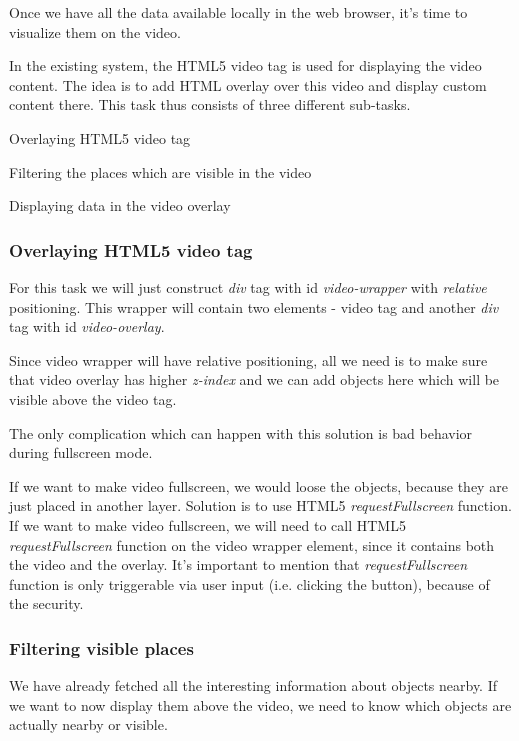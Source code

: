 \documentclass[journal]{IEEEtran}
\begin{document}
Once we have all the data available locally in the web browser, it's time to visualize them on the video. 

In the existing system, the HTML5 video tag is used for displaying the video content. The idea is to add HTML overlay over this video and display custom content there. This task thus consists of three different sub-tasks.

	\begin{list}{\textbullet}{}
		\item Overlaying HTML5 video tag
		\item Filtering the places which are visible in the video
		\item Displaying data in the video overlay
	\end{list}

\subsubsection{Overlaying HTML5 video tag}

For this task we will just construct \textit{div} tag with id \textit{video-wrapper} with \textit{relative} positioning. This wrapper will contain two elements - video tag and another \textit{div} tag with id \textit{video-overlay}.

Since video wrapper will have relative positioning, all we need is to make sure that video overlay has higher \textit{z-index} and we can add objects here which will be visible above the video tag.

The only complication which can happen with this solution is bad behavior during fullscreen mode.

If we want to make video fullscreen, we would loose the objects, because they are just placed in another layer. Solution is to use HTML5 \textit{requestFullscreen} function. If we want to make video fullscreen, we will need to call HTML5 \textit{requestFullscreen} function on the video wrapper element, since it contains both the video and the overlay. It's important to mention that \textit{requestFullscreen} function is only triggerable via user input (i.e. clicking the button), because of the security.

\subsubsection{Filtering visible places}

We have already fetched all the interesting information about objects nearby. If we want to now display them above the video, we need to know which objects are actually nearby or visible.
\end{document}
